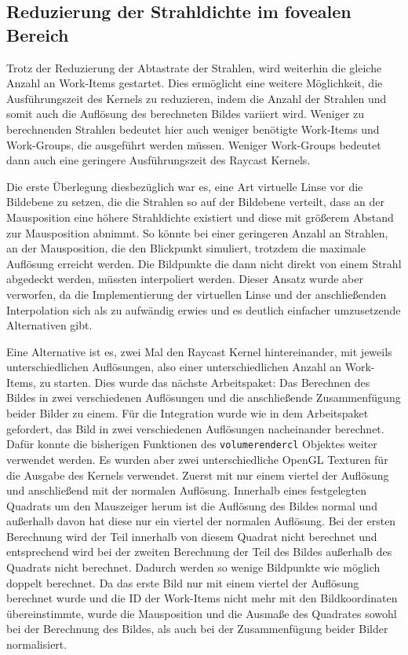 \subsection{Reduzierung der Strahldichte im fovealen Bereich}\label{ss::MDC}
Trotz der Reduzierung der Abtastrate der Strahlen, wird weiterhin die gleiche Anzahl an Work-Items gestartet.
Dies ermöglicht eine weitere Möglichkeit, die Ausführungszeit des Kernels zu reduzieren, indem die Anzahl der Strahlen und somit auch die Auflösung des berechneten Bildes variiert wird.
Weniger zu berechnenden Strahlen bedeutet hier auch weniger benötigte Work-Items und Work-Groups, die ausgeführt werden müssen.
Weniger Work-Groups bedeutet dann auch eine geringere Ausführungszeit des Raycast Kernels.

Die erste Überlegung diesbezüglich war es, eine Art virtuelle Linse vor die Bildebene zu setzen, die die Strahlen so auf der Bildebene verteilt, dass an der Mausposition eine höhere Strahldichte existiert und diese mit größerem Abstand zur Mausposition abnimmt.
So könnte bei einer geringeren Anzahl an Strahlen, an der Mausposition, die den Blickpunkt simuliert, trotzdem die maximale Auflösung erreicht werden.
Die Bildpunkte die dann nicht direkt von einem Strahl abgedeckt werden, müssten interpoliert werden.
Dieser Ansatz wurde aber verworfen, da die Implementierung der virtuellen Linse und der anschließenden Interpolation sich als zu aufwändig erwies und es deutlich einfacher umzusetzende Alternativen gibt.

Eine Alternative ist es, zwei Mal den Raycast Kernel hintereinander, mit jeweils unterschiedlichen Auflösungen, also einer unterschiedlichen Anzahl an Work-Items, zu starten.
Dies wurde das nächste Arbeitspaket: Das Berechnen des Bildes in zwei verschiedenen Auflösungen und die anschließende Zusammenfügung beider Bilder zu einem.
Für die Integration wurde wie in dem Arbeitspaket gefordert, das Bild in zwei verschiedenen Auflösungen nacheinander berechnet.
Dafür konnte die bisherigen Funktionen des \texttt{volumerendercl} Objektes weiter verwendet werden.
Es wurden aber zwei unterschiedliche OpenGL Texturen für die Ausgabe des Kernels verwendet.
Zuerst mit nur einem viertel der Auflösung und anschließend mit der normalen Auflösung.
Innerhalb eines festgelegten Quadrats um den Mauszeiger herum ist die Auflösung des Bildes normal und außerhalb davon hat diese nur ein viertel der normalen Auflösung.
Bei der ersten Berechnung wird der Teil innerhalb von diesem Quadrat nicht berechnet und entsprechend wird bei der zweiten Berechnung der Teil des Bildes außerhalb des Quadrats nicht berechnet.
Dadurch werden so wenige Bildpunkte wie möglich doppelt berechnet.
Da das erste Bild nur mit einem viertel der Auflösung berechnet wurde und die ID der Work-Items nicht mehr mit den Bildkoordinaten übereinstimmte, wurde die Mausposition und die Ausmaße des Quadrates sowohl bei der Berechnung des Bildes, als auch bei der Zusammenfügung beider Bilder normalisiert.

